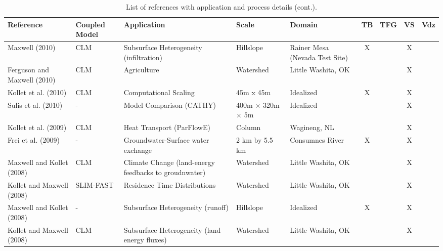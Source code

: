 {\begin{table} \center
\renewcommand{\arraystretch}{2.5}
\center

\caption{List of \parflow{} references with application and process details (cont.).}

\begin{tabular}{ l  p{1.5cm} p{2cm} p{1.5cm} p{1.5cm} | c | c | c | c }
\bf{Reference} & \bf{Coupled Model} & \bf{Application} & \bf{Scale} & \bf{Domain} & \bf{TB} & \bf{TFG} & \bf{VS} & \bf{Vdz} \\ 
\hline{}
   
\cite{M10} Maxwell (2010) & CLM & Subsurface Heterogeneity (infiltration) & Hillslope & Rainer Mesa (Nevada Test Site) & X &   & X &     \\
\cite{FM10} Ferguson and Maxwell (2010) & CLM & Agriculture & Watershed & Little Washita, OK &   &   & X &     \\
\cite{KMWSVVS10} Kollet et al. (2010) & CLM & Computational Scaling & 45m x 45m & Idealized & X &   & X &     \\
\cite{SMPMPK10} Sulis et al. (2010) & - & Model Comparison (CATHY) & 400m × 320m × 5m & Idealized &   &   & X &     \\
\cite{KCSMMB09} Kollet et al. (2009) & CLM & Heat Transport (ParFlowE) & Column & Wagineng, NL &   &   & X &     \\
\cite{FFKM09} Frei et al. (2009) & - & Groundwater-Surface water exchange & 2 km by 5.5 km & Consumnes River & X &   & X &     \\
\cite{MK08a} Maxwell and Kollet (2008) & CLM & Climate Change (land-energy feedbacks to groudnwater) & Watershed & Little Washita, OK &   &   & X &     \\
\cite{KM08b} Kollet and Maxwell (2008) & SLIM-FAST & Residence Time Distributions  & Watershed & Little Washita, OK &   &   & X &     \\
\cite{MK08b} Maxwell and Kollet (2008) & - & Subsurface Heterogeneity (runoff) & Hillslope & Idealized & X &   & X &     \\
\cite{KM08a} Kollet and Maxwell (2008) & CLM & Subsurface Heterogeneity (land energy fluxes) & Watershed & Little Washita, OK &   &   & X &     \\
\end{tabular}
\label{pfref3}
\end{table}

\begin{table} \center
\renewcommand{\arraystretch}{2.5}
\center


\end{table}}
